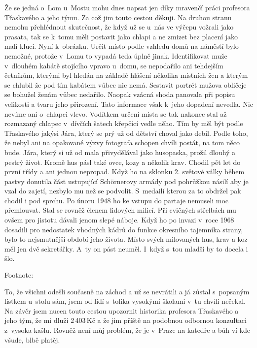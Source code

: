 
Že se jedná o~Lom u~Mostu mohu dnes napsat jen díky mravenčí práci
profesora Třaskavého a jeho týmu. Za což jim touto cestou děkuji. Na
druhou stranu nemohu přehlédnout skutečnost, že když už se u~nás ve
výčepu vožrali jako prasata, tak se k~tomu měli postavit jako chlapi a
ne zmizet bez placení jako malí kluci. Nyní k~obrázku. Určit místo
podle vzhledu domů na náměstí bylo nemožné, protože v~Lomu to vypadá
teda úplně jinak. Identifikovat muže v~dlouhém kabátě stojícího vpravo
u~domu, se nepodařilo ani tehdejším četníkům, kterými byl hledán na
základě hlášení několika místních žen a kterým se chlubil že pod tím
kabátem vůbec nic nemá. Sestavit portrét mužova obličeje se bohužel
ženám vůbec nedařilo. Naopak vzácná shoda panovala při popisu
velikosti a tvaru jeho přirození. Tato informace však k~jeho dopadení
nevedla. Nic nevíme ani o~chlapci vlevo. Vodítkem určení místa se tak
nakonec stal až rozmazaný chlapec v~dívčích šatech křepčící vedle
něho. Tím by měl být podle Třaskavého jakýsi Jára, který se prý už od
dětství choval jako debil. Podle toho, že nebyl ani na opakované výzvy
fotografa schopen chvíli postát, na tom něco bude. Jára, který si už
od mala přivydělával jako husopaska, prožil dlouhý a pestrý život.
Kromě hus pásl také ovce, kozy a několik krav. Chodil pět let do první
třídy a ani jednou nepropad. Když ho na sklonku 2. světové války během
pastvy donutila část ustupující Schörnerovy armády pod pohrůžkou
násilí aby je vzal do zajetí, nezbylo mu než se podvolit. S~medailí
kterou za to obdržel pak chodil i pod sprchu. Po únoru 1948 ho ke
vstupu do partaje nemuseli moc přemlouvat. Stal se rovněž členem
lidových milicí. Při cvičných střelbách mu ovšem pro jistotu dávali
jenom slepé náboje. Když ho po invazi v~roce 1968 dosadili pro
nedostatek vhodných kádrů do funkce okresního tajemníka strany, bylo
to nejsmutnější období jeho života. Místo svých milovaných hus, krav a
koz měl jen dvě sekretářky. A~ty on pást neuměl. I~když s~tou mladší by
to docela i šlo.

Footnote:

To, že všichni odešli současně na záchod a už se nevrátili a já zůstal
s~popsaným lístkem u~stolu sám, jsem od lidí s~tolika vysokými školami
v~tu chvíli nečekal. Na závěr jsem nucen touto cestou upozornit
historika profesora Třaskavého a jeho tým, že mi dluží 2\,403\,Kč a že
jim příště na podobnou odbornou konzultaci z~vysoka kašlu. Rovněž není
můj problém, že je v~Praze na katedře a bůh ví kde všude, blbě platěj.


